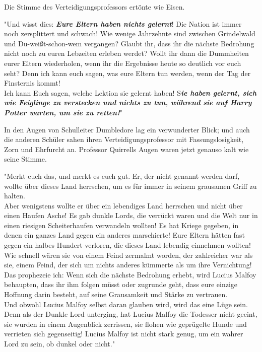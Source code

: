 {Die Stimme des Verteidigungsprofessors ertönte wie Eisen.

"Und wisst dies: \textbf{\emph{Eure Eltern haben nichts gelernt}}! Die Nation ist immer noch zersplittert und schwach! Wie wenige Jahrzehnte sind zwischen Grindelwald und Du-weißt-schon-wem vergangen? Glaubt ihr, dass ihr die nächste Bedrohung nicht noch zu euren Lebzeiten erleben werdet? Wollt ihr dann die Dummheiten eurer Eltern wiederholen, wenn ihr die Ergebnisse heute so deutlich vor euch seht? Denn ich kann euch sagen, was eure Eltern tun werden, wenn der Tag der Finsternis kommt!\\ Ich kann Euch sagen, welche Lektion sie gelernt haben! S\textbf{\emph{ie haben gelernt, sich wie Feiglinge zu verstecken und nichts zu tun, während sie auf Harry Potter warten, um sie zu retten!}}"

In den Augen von Schulleiter Dumbledore lag ein verwunderter Blick; und auch die anderen Schüler sahen ihren Verteidigungsprofessor mit Fassungslosigkeit, Zorn und Ehrfurcht an. Professor Quirrells Augen waren jetzt genauso kalt wie seine Stimme.

"Merkt euch das, und merkt es euch gut. Er, der nicht genannt werden darf, wollte über dieses Land herrschen, um es für immer in seinem grausamen Griff zu halten.\\ Aber wenigstens wollte er über ein lebendiges Land herrschen und nicht über einen Haufen Asche! Es gab dunkle Lords, die verrückt waren und die Welt nur in einen riesigen Scheiterhaufen verwandeln wollten! Es hat Kriege gegeben, in denen ein ganzes Land gegen ein anderes marschierte! Eure Eltern hätten fast gegen ein halbes Hundert verloren, die dieses Land lebendig einnehmen wollten!\\ Wie schnell wären sie von einem Feind zermalmt worden, der zahlreicher war als sie, einem Feind, der sich um nichts anderes kümmerte als um ihre Vernichtung!\\ Das prophezeie ich: Wenn sich die nächste Bedrohung erhebt, wird Lucius Malfoy behaupten, dass ihr ihm folgen müsst oder zugrunde geht, dass eure einzige Hoffnung darin besteht, auf seine Grausamkeit und Stärke zu vertrauen.\\ Und obwohl Lucius Malfoy selbst daran glauben wird, wird das eine Lüge sein. Denn als der Dunkle Lord unterging, hat Lucius Malfoy die Todesser nicht geeint, sie wurden in einem Augenblick zerrissen, sie flohen wie geprügelte Hunde und verrieten sich gegenseitig! Lucius Malfoy ist nicht stark genug, um ein wahrer Lord zu sein, ob dunkel oder nicht."

}

